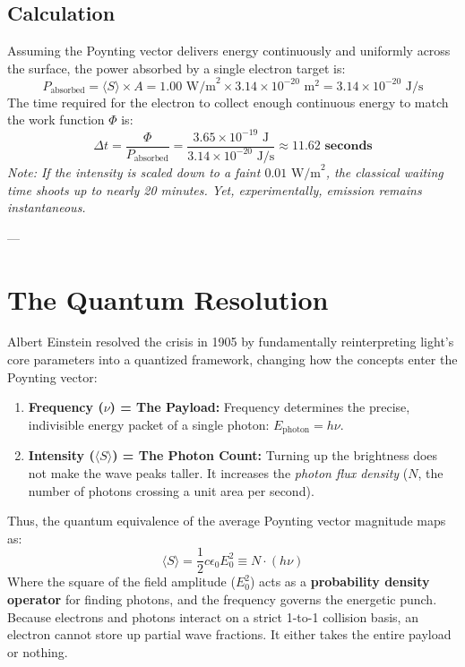 \documentclass[11pt,a4paper]{article}
\begin{document}
	\subsection{Calculation}
	Assuming the Poynting vector delivers energy continuously and uniformly across the surface, the power absorbed by a single electron target is:
	\begin{equation}
		P_{\text{absorbed}} = \langle S \rangle \times A = 1.00 \text{ W/m}^2 \times 3.14 \times 10^{-20} \text{ m}^2 = 3.14 \times 10^{-20} \text{ J/s}
	\end{equation}
	The time required for the electron to collect enough continuous energy to match the work function $\Phi$ is:
	\begin{equation}
		\Delta t = \frac{\Phi}{P_{\text{absorbed}}} = \frac{3.65 \times 10^{-19} \text{ J}}{3.14 \times 10^{-20} \text{ J/s}} \approx \mathbf{11.62 \text{ seconds}}
	\end{equation}
	\textit{Note: If the intensity is scaled down to a faint $0.01 \text{ W/m}^2$, the classical waiting time shoots up to nearly 20 minutes. Yet, experimentally, emission remains instantaneous.}
	
	---
	
	\section{The Quantum Resolution}
	Albert Einstein resolved the crisis in 1905 by fundamentally reinterpreting light's core parameters into a quantized framework, changing how the concepts enter the Poynting vector:
	
	\begin{enumerate}
		\item \textbf{Frequency ($\nu$) = The Payload:} Frequency determines the precise, indivisible energy packet of a single photon: $E_{\text{photon}} = h\nu$.
		\item \textbf{Intensity ($\langle S \rangle$) = The Photon Count:} Turning up the brightness does not make the wave peaks taller. It increases the \textit{photon flux density} ($N$, the number of photons crossing a unit area per second).
	\end{enumerate}
	
	Thus, the quantum equivalence of the average Poynting vector magnitude maps as:
	\begin{equation}
		\langle S \rangle = \frac{1}{2} c \epsilon_0 E_0^2 \equiv N \cdot (h\nu)
	\end{equation}
	Where the square of the field amplitude ($E_0^2$) acts as a \textbf{probability density operator} for finding photons, and the frequency governs the energetic punch. Because electrons and photons interact on a strict 1-to-1 collision basis, an electron cannot store up partial wave fractions. It either takes the entire payload or nothing.
	
\end{document}
